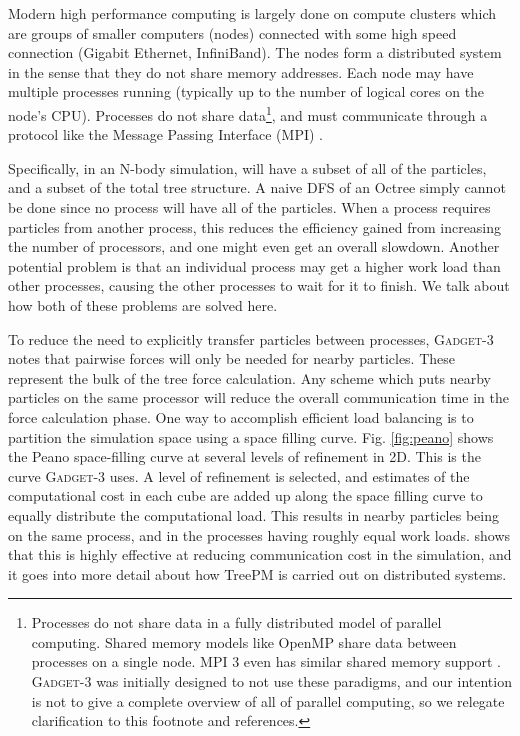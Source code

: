 Modern high performance computing is largely done on compute clusters which are groups of smaller computers (nodes) connected with some high speed connection (Gigabit Ethernet, InfiniBand). The nodes form a distributed system in the sense that they do not share memory addresses. Each node may have multiple processes running (typically up to the number of logical cores on the node's CPU). Processes do not share data\footnote{Processes do not share data in a fully distributed model of parallel computing. Shared memory models like OpenMP \citep{openmp} share data between processes on a single node. MPI 3 even has similar shared memory support \citep{mpi3_shared}. \textsc{Gadget-3} was initially designed to not use these paradigms, and our intention is not to give a complete overview of all of parallel computing, so we relegate clarification to this footnote and references.}, and must communicate through a protocol like the Message Passing Interface (MPI) \citep{mpi_standard}.

Specifically, in an N-body simulation,  will have a subset of all of the particles, and a subset of the total tree structure. A naive DFS of an Octree simply cannot be done since no process will have all of the particles. When a process requires particles from another process, this reduces the efficiency gained from increasing the number of processors, and one might even get an overall slowdown. Another potential problem is that an individual process may get a higher work load than other processes, causing the other processes to wait for it to finish. We talk about how both of these problems are solved here.

To reduce the need to explicitly transfer particles between processes, \textsc{Gadget-3} notes that pairwise forces will only be needed for nearby particles. These represent the bulk of the tree force calculation. Any scheme which puts nearby particles on the same processor will reduce the overall communication time in the force calculation phase. One way to accomplish efficient load balancing is to partition the simulation space using a space filling curve. Fig. \ref{fig:peano} shows the Peano space-filling curve at several levels of refinement in 2D. This is the curve \textsc{Gadget-3} uses. A level of refinement is selected, and estimates of the computational cost in each cube are added up along the space filling curve to equally distribute the computational load. This results in nearby particles being on the same process, and in the processes having roughly equal work loads. \citet{GadgetCodePaper} shows that this is highly effective at reducing communication cost in the simulation, and it goes into more detail about how TreePM is carried out on distributed systems.



